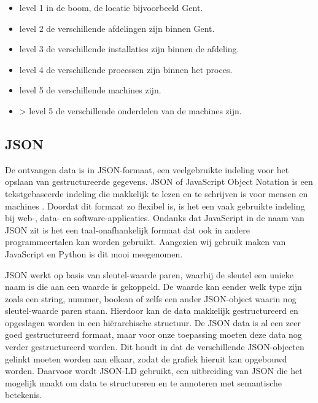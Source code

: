 \begin{itemize}
     \item level 1 in de boom, de locatie bijvoorbeeld Gent.
     \item level 2 de verschillende afdelingen zijn binnen Gent.
     \item level 3 de verschillende installaties zijn binnen de afdeling.
     \item level 4 de verschillende processen zijn binnen het proces.
     \item level 5 de verschillende machines zijn.
     \item > level 5 de verschillende onderdelen van de machines zijn.
\end{itemize}


\subsection{JSON}
De ontvangen data is in JSON-formaat, een veelgebruikte indeling voor het opslaan van gestructureerde gegevens.
JSON of JavaScript Object Notation is een tekstgebaseerde indeling die makkelijk te lezen en te schrijven is voor mensen en machines \autocite{Erickson2024}.
Doordat dit formaat zo flexibel is, is het een vaak gebruikte indeling bij web-, data- en software-applicaties.
Ondanks dat JavaScript in de naam van JSON zit is het een taal-onafhankelijk formaat dat ook in andere programmeertalen kan worden gebruikt.
Aangezien wij gebruik maken van JavaScript en Python is dit mooi meegenomen.

JSON werkt op basis van sleutel-waarde paren, waarbij de sleutel een unieke naam is die aan een waarde is gekoppeld.
De waarde kan eender welk type zijn zoals een string, nummer, boolean of zelfs een ander JSON-object waarin nog sleutel-waarde paren staan.
Hierdoor kan de data makkelijk gestructureerd en opgeslagen worden in een hiërarchische structuur.
De JSON data is al een zeer goed gestructureerd formaat, maar voor onze toepassing moeten deze data nog verder gestructureerd worden.
Dit houdt in dat de verschillende JSON-objecten gelinkt moeten worden aan elkaar, zodat de grafiek hieruit kan opgebouwd worden.
Daarvoor wordt JSON-LD gebruikt, een uitbreiding van JSON die het mogelijk maakt om data te structureren en te annoteren met semantische betekenis.

